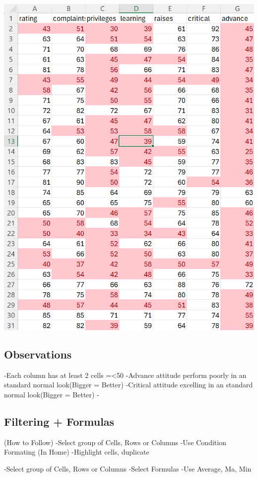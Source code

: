 \documentclass[
  letterpaper,
  DIV=11,
  numbers=noendperiod]{scrreprt}
\begin{document}
\includegraphics{./Excel_1_Unit/Week1_Diego/Week_1DJ/screenshots/Attitude_Base1.png}

\subsection{Observations}\label{observations}

-Each column has at least 2 cells =\textless50 -Advance attitude perform
poorly in an standard normal look(Bigger = Better) -Critical attitude
excelling in an standard normal look(Bigger = Better) -

\subsection{Filtering + Formulas}\label{filtering-formulas}

(How to Follow) -Select group of Cells, Rows or Columns -Use Condition
Formating (In Home) -Highlight cells, duplicate

-Select group of Cells, Rows or Columns -Select Formulas -Use Average,
Ma, Min
\end{document}
